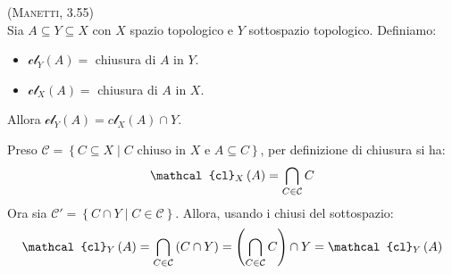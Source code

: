 \begin{lemming}\textsc{(Manetti, 3.55)}\\
Sia $A\subseteq Y\subseteq X$ con $X$ spazio topologico e $Y$ sottospazio topologico. Definiamo:
\begin{itemize}
\item $\mathcal{cl}_Y\left(A\right)=$ chiusura di $A$ in $Y$.
\item $\mathcal{cl}_X\left(A\right)=$ chiusura di $A$ in $X$.
\end{itemize}
Allora $\mathcal{cl}_Y\left(A\right)=c\mathcal{l}_X\left(A\right)\cap Y$.
\end{lemming}
\begin{demonstration}
Preso $\mathcal{C}=\left\{C\subseteq X\mid C\text{ chiuso in }X\text{ e } A\subseteq C\right\}$, per definizione di chiusura si ha:
\begin{equation*}
\mathcal{cl}_X\left(A\right)=\inter_{C\in\mathcal{C}}C
\end{equation*}
Ora sia $\mathcal{C}'=\left\{C\cap Y\mid C\in\mathcal{C}\right\}$. Allora, usando i chiusi del sottospazio:
\begin{equation*}
\mathcal{cl}_Y\left(A\right)=\inter_{C\in\mathcal{C}}\left(C\cap Y\right)=\left(\inter_{C\in\mathcal{C}}C\right)\cap Y=\mathcal{cl}_Y\left(A\right)
\end{equation*}
\end{demonstration}

